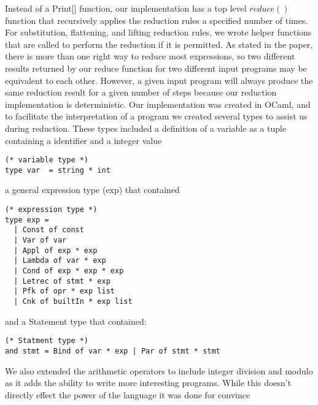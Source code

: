 \documentclass[preprint, 10pt]{sigplanconf}
\begin{document}
Instead of a Print[] function, our implementation has a top level $reduce()$ function that recursively applies the reduction rules a specified number of times.  For substitution, flattening, and lifting reduction rules, we wrote helper functions that are called to perform the reduction if it is permitted.  As stated in the paper, there is more than one right way to reduce most expressions, so two different results returned by our reduce function for two different input programs may be equivalent to each other.  However, a given input program will always produce the same reduction result for a given number of steps because our reduction implementation is deterministic.  Our implementation was created in OCaml, and to facilitate the interpretation of a program we created several types to assist us during reduction. These types included a definition of a variable as a tuple containing a identifier and a integer value

\begin{verbatim}
(* variable type *)
type var  = string * int
\end{verbatim}

a general expression type (exp) that contained

\begin{verbatim}
(* expression type *)
type exp =
  | Const of const
  | Var of var
  | Appl of exp * exp
  | Lambda of var * exp
  | Cond of exp * exp * exp
  | Letrec of stmt * exp
  | Pfk of opr * exp list
  | Cnk of builtIn * exp list 
\end{verbatim}

and a Statement type that contained: 

\begin{verbatim}
(* Statment type *)
and stmt = Bind of var * exp | Par of stmt * stmt
\end{verbatim}

We also extended the arithmetic operators to include integer division and modulo as it adds the ability to write more interesting programs. While this doesn’t directly effect the power of the language it was done for convince 
\end{document}
